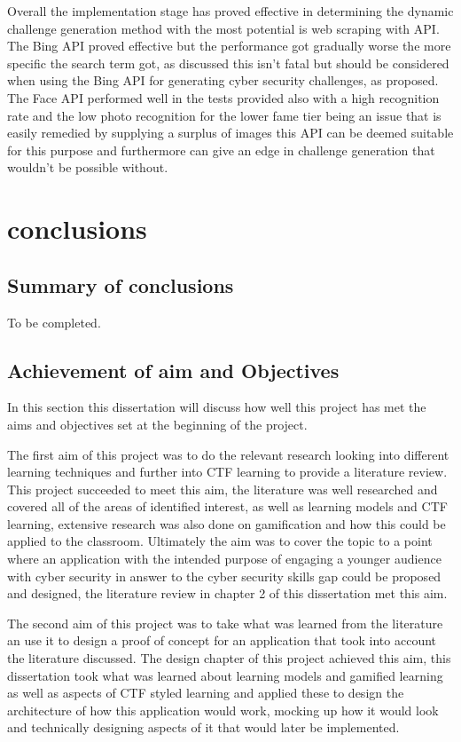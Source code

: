 \documentclass[12pt,a4paper]{article}
\begin{document}
Overall the implementation stage has proved effective in determining the dynamic challenge generation method with the most potential is web scraping with API. The Bing API proved effective but the performance got gradually worse the more specific the search term got, as discussed this isn't fatal but should be considered when using the Bing API for generating cyber security challenges, as proposed. The Face API performed well in the tests provided also with a high recognition rate and the low photo recognition for the lower fame tier being an issue that is easily remedied by supplying a surplus of images this API can be deemed suitable for this purpose and furthermore can give an edge in challenge generation that wouldn't be possible without. 

\newpage
\section{conclusions} 
\subsection{Summary of conclusions}
To be completed.

\subsection{Achievement of aim and Objectives}  
In this section this dissertation will discuss how well this project has met the aims and objectives set at the beginning of the project.  

The first aim of this project was to do the relevant research looking into different learning techniques and further into CTF learning to provide a literature review. This project succeeded to meet this aim, the literature was well researched and covered all of the areas of identified interest, as well as learning models and CTF learning, extensive research was also done on gamification and how this could be applied to the classroom. Ultimately the aim was to cover the topic to a point where an application with the intended purpose of engaging a younger audience with cyber security in answer to the cyber security skills gap could be proposed and designed, the literature review in chapter 2 of this dissertation met this aim.   

The second aim of this project was to take what was learned from the literature an use it to design a proof of concept for an application that took into account the literature discussed. The design chapter of this project achieved this aim, this dissertation took what was learned about learning models and gamified learning as well as aspects of CTF styled learning and applied these to design the architecture of how this application would work, mocking up how it would look and technically designing aspects of it that would later be implemented. 
\end{document}

